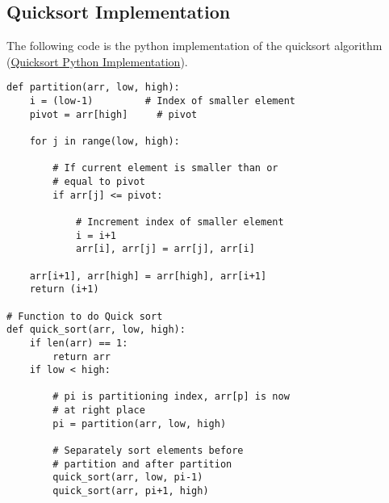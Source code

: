 \subsection{Quicksort Implementation}
The following code is the python implementation of the quicksort algorithm \cite{quicksortcode} (\href{https://www.geeksforgeeks.org/python-program-for-quicksort/}{Quicksort Python Implementation}).
\begin{lstlisting}[firstnumber=1, caption={Quicksort python implementation.}]
def partition(arr, low, high): 
    i = (low-1)         # Index of smaller element 
    pivot = arr[high]     # pivot 
  
    for j in range(low, high): 
  
        # If current element is smaller than or 
        # equal to pivot 
        if arr[j] <= pivot: 
  
            # Increment index of smaller element 
            i = i+1
            arr[i], arr[j] = arr[j], arr[i] 
  
    arr[i+1], arr[high] = arr[high], arr[i+1] 
    return (i+1) 
    
# Function to do Quick sort   
def quick_sort(arr, low, high): 
    if len(arr) == 1: 
        return arr 
    if low < high: 
  
        # pi is partitioning index, arr[p] is now 
        # at right place 
        pi = partition(arr, low, high) 
  
        # Separately sort elements before 
        # partition and after partition 
        quick_sort(arr, low, pi-1) 
        quick_sort(arr, pi+1, high)
    
\end{lstlisting}


